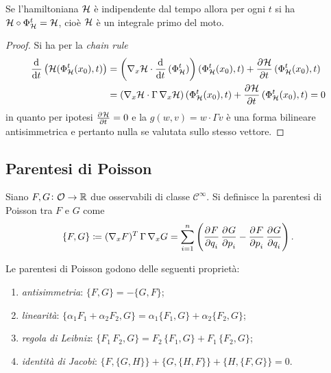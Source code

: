 \begin{thm}
    Se l'hamiltoniana $ \mathcal{H} $ è indipendente dal tempo allora per ogni $ t $ si ha $ \mathcal{H} \circ \Phi_{\mathcal{H}}^t = \mathcal{H} $, cioè $ \mathcal{H} $ è un integrale primo del moto.
\end{thm}
\begin{proof}
    Si ha per la \emph{chain rule}
    \begin{align*}
        \dod{}{t} \left(\ham(\Phi_\ham^t(x_0), t)\right) & = \left(\nabla_x \ham \cdot \dod{}{t}(\Phi^t_\ham)\right)(\Phi^t_\ham(x_0), t) + \dpd{\ham}{t}(\Phi_\ham^t(x_0), t) \\
        & = \left(\nabla_x \ham \cdot \Gamma \, \nabla_x \ham\right)(\Phi^t_\ham(x_0), t) + \dpd{\ham}{t}(\Phi_\ham^t(x_0), t) = 0
    \end{align*}
    in quanto per ipotesi $ \pd{\ham}{t} = 0 $ e la $ g(w, v) = w \cdot \Gamma v $ è una forma bilineare antisimmetrica e pertanto nulla se valutata sullo stesso vettore.
\end{proof}

\subsection{Parentesi di Poisson}
\begin{definition}
    Siano $ F, G \colon \mathcal{O} \to \mathbb{R} $ due osservabili di classe $ \mathcal{C}^\infty $. Si definisce la parentesi di Poisson tra $ F $ e $ G $ come
    \begin{equation}
        \left\{F, G\right\} \coloneqq (\nabla_x F)^T \,\Gamma\, \nabla_x G = \sum_{i=1}^{n} \left(\dpd{F}{q_i} \dpd{G}{p_i} - \dpd{F}{p_i}\dpd{G}{q_i}\right).
    \end{equation}
\end{definition}

\begin{proposition}
    Le parentesi di Poisson godono delle seguenti proprietà:
    \begin{enumerate}[label=(\roman*)]
        \item \emph{antisimmetria}: $ \{F, G\} = - \{G, F\} $;
        \item \emph{linearità}: $ \{\alpha_1 F_1 + \alpha_2 F_2, G\} = \alpha_1 \{F_1, G\} + \alpha_2\{F_2, G\} $;
        \item \emph{regola di Leibniz}: $ \{F_1 \, F_2, G\} = F_2 \, \{F_1, G\} + F_1 \, \{F_2, G\} $;
        \item \emph{identità di Jacobi}: $ \{F, \{G, H\}\} + \{G, \{H, F\}\} + \{H, \{F, G\}\} = 0 $.
    \end{enumerate}
\end{proposition}

